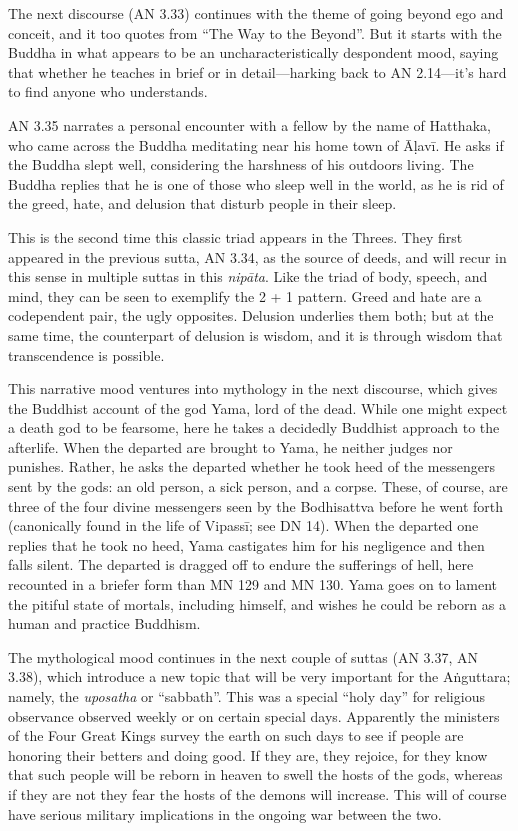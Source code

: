 \documentclass[12pt,openany]{book}%
\begin{document}
The next discourse (AN 3.33) continues with the theme of going beyond ego and conceit, and it too quotes from “The Way to the Beyond”. But it starts with the Buddha in what appears to be an uncharacteristically despondent mood, saying that whether he teaches in brief or in detail—harking back to AN 2.14—it’s hard to find anyone who understands.

AN 3.35 narrates a personal encounter with a fellow by the name of Hatthaka, who came across the Buddha meditating near his home town of \textsanskrit{Āḷavī}. He asks if the Buddha slept well, considering the harshness of his outdoors living. The Buddha replies that he is one of those who sleep well in the world, as he is rid of the greed, hate, and delusion that disturb people in their sleep.

This is the second time this classic triad appears in the Threes. They first appeared in the previous sutta, AN 3.34, as the source of deeds, and will recur in this sense in multiple suttas in this \textit{\textsanskrit{nipāta}}. Like the triad of body, speech, and mind, they can be seen to exemplify the 2 + 1 pattern. Greed and hate are a codependent pair, the ugly opposites. Delusion underlies them both; but at the same time, the counterpart of delusion is wisdom, and it is through wisdom that transcendence is possible.

This narrative mood ventures into mythology in the next discourse, which gives the Buddhist account of the god Yama, lord of the dead. While one might expect a death god to be fearsome, here he takes a decidedly Buddhist approach to the afterlife. When the departed are brought to Yama, he neither judges nor punishes. Rather, he asks the departed whether he took heed of the messengers sent by the gods: an old person, a sick person, and a corpse. These, of course, are three of the four divine messengers seen by the Bodhisattva before he went forth (canonically found in the life of \textsanskrit{Vipassī}; see DN 14). When the departed one replies that he took no heed, Yama castigates him for his negligence and then falls silent. The departed is dragged off to endure the sufferings of hell, here recounted in a briefer form than MN 129 and MN 130. Yama goes on to lament the pitiful state of mortals, including himself, and wishes he could be reborn as a human and practice Buddhism.

The mythological mood continues in the next couple of suttas (AN 3.37, AN 3.38), which introduce a new topic that will be very important for the \textsanskrit{Aṅguttara}; namely, the \textit{uposatha} or “sabbath”. This was a special “holy day” for religious observance observed weekly or on certain special days. Apparently the ministers of the Four Great Kings survey the earth on such days to see if people are honoring their betters and doing good. If they are, they rejoice, for they know that such people will be reborn in heaven to swell the hosts of the gods, whereas if they are not they fear the hosts of the demons will increase. This will of course have serious military implications in the ongoing war between the two.
\end{document}
